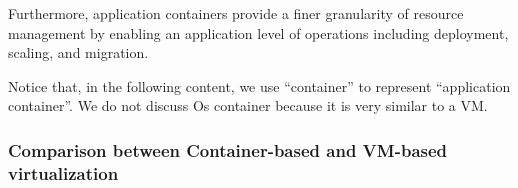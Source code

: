  Furthermore, application containers provide a finer granularity of resource management by enabling an application level of operations including deployment, scaling, and migration.  

Notice that, in the following content, we use ``container'' to represent ``application container''. 
We do not discuss Os container because it is very similar to a VM.




\subsubsection{Comparison between Container-based and VM-based virtualization} 
\label{sec:comparison_container_vm}


